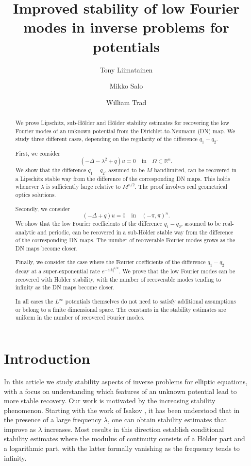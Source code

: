 \documentclass[a4paper, 11pt, twoside, notitlepage]{amsart}
\title[Improved stability of low Fourier modes]{Improved stability of low Fourier modes in inverse problems for potentials}
\author{Tony Liimatainen}
\author{Mikko Salo}
\author{William Trad}
\theoremstyle{definition}
\theoremstyle{remark}
\newcommand{\R}{{\mathbb R}}
\begin{document}
\maketitle

\begin{abstract}
We prove Lipschitz, sub-H\"older and H\"older stability estimates for recovering the low 
Fourier modes of an unknown potential from the Dirichlet-to-Neumann (DN) map. We study three different cases, depending on the regularity of the difference $q_1-q_2$. 

First, we consider 
\[
(-\Delta - \lambda^2 + q)u=0 \quad \text{in} \quad \Omega\subset \R^n.
\]
We show that the difference 
$q_1-q_2$, assumed to be $M$-bandlimited, can be recovered in a Lipschitz 
stable way from the difference of the corresponding DN maps. This holds 
whenever $\lambda$ is sufficiently large relative to $M^{n/2}$. The 
proof involves real geometrical optics solutions.

Secondly, we consider 
\[
(-\Delta + q)u=0 \quad \text{in} \quad (-\pi,\pi)^n.
\]
We show that the low Fourier 
coefficients of the difference $q_1-q_2$, assumed to be real-analytic and periodic, can be recovered in a 
sub-H\"older stable way from the difference of the corresponding DN maps. The 
number of recoverable Fourier modes grows as the DN maps become closer. 

Finally, we consider the case where the Fourier coefficients of the difference $q_1-q_2$ decay at a super-exponential rate $e^{-c|k|^{n/2}}$. We prove that the low Fourier modes can be recovered with H\"older stability, with the number of recoverable modes tending to infinity as the DN maps become closer. 


In all cases the $L^\infty$ potentials themselves do not need to satisfy additional assumptions or belong to a finite dimensional space. The constants in the stability estimates are uniform in the number of recovered Fourier modes.

\end{abstract}


\section{Introduction}


In this article we study stability aspects of inverse problems for elliptic equations, with a focus on understanding which features of an unknown potential lead to more stable recovery. Our work is motivated by the increasing stability phenomenon. Starting with the work of Isakov \cite{isakov_increasing_2011}, it has been understood that in the presence of a large frequency $\lambda$, one can obtain stability estimates that improve as $\lambda$ increases. Most results in this direction establish conditional stability estimates where the modulus of continuity consists of a Hölder part and a logarithmic part, with the latter formally vanishing as the frequency tends to infinity. %
\end{document}
